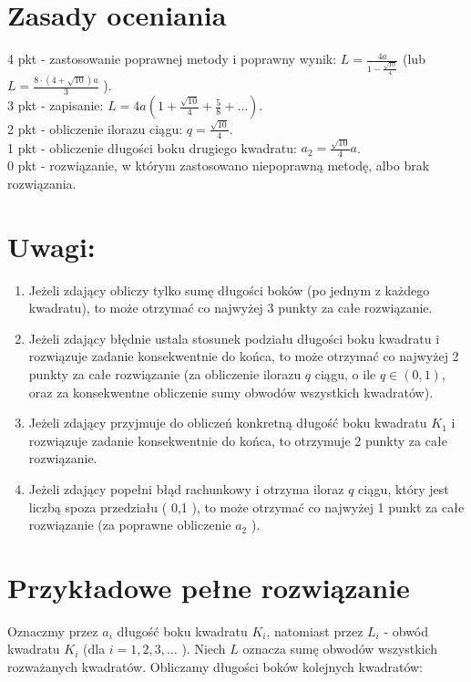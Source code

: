 \documentclass[10pt]{article}
\begin{document}
\section*{Zasady oceniania}
4 pkt - zastosowanie poprawnej metody i poprawny wynik: $L=\frac{4 a}{1-\frac{\sqrt{10}}{4}}$ (lub $L=\frac{8 \cdot(4+\sqrt{10}) a}{3}$ ).\\
3 pkt - zapisanie: $L=4 a\left(1+\frac{\sqrt{10}}{4}+\frac{5}{8}+\ldots\right)$.\\
2 pkt - obliczenie ilorazu ciągu: $q=\frac{\sqrt{10}}{4}$.\\
1 pkt - obliczenie długości boku drugiego kwadratu: $a_{2}=\frac{\sqrt{10}}{4} a$.\\
0 pkt - rozwiązanie, w którym zastosowano niepoprawną metodę, albo brak rozwiązania.

\section*{Uwagi:}
\begin{enumerate}
  \item Jeżeli zdający obliczy tylko sumę długości boków (po jednym z każdego kwadratu), to może otrzymać co najwyżej 3 punkty za całe rozwiązanie.
  \item Jeżeli zdający błędnie ustala stosunek podziału długości boku kwadratu i rozwiązuje zadanie konsekwentnie do końca, to może otrzymać co najwyżej 2 punkty za całe rozwiązanie (za obliczenie ilorazu $q$ ciągu, o ile $q \in(0,1)$, oraz za konsekwentne obliczenie sumy obwodów wszystkich kwadratów).
  \item Jeżeli zdający przyjmuje do obliczeń konkretną długość boku kwadratu $K_{1}$ i rozwiązuje zadanie konsekwentnie do końca, to otrzymuje 2 punkty za całe rozwiązanie.
  \item Jeżeli zdający popełni błąd rachunkowy i otrzyma iloraz $q$ ciągu, który jest liczbą spoza przedziału ( 0,1 ), to może otrzymać co najwyżej 1 punkt za całe rozwiązanie (za poprawne obliczenie $a_{2}$ ).
\end{enumerate}

\section*{Przykładowe pełne rozwiązanie}
Oznaczmy przez $a_{i}$ długość boku kwadratu $K_{i}$, natomiast przez $L_{i}$ - obwód kwadratu $K_{i}$ (dla $i=1,2,3, \ldots$ ). Niech $L$ oznacza sumę obwodów wszystkich rozważanych kwadratów. Obliczamy długości boków kolejnych kwadratów:
\end{document}
